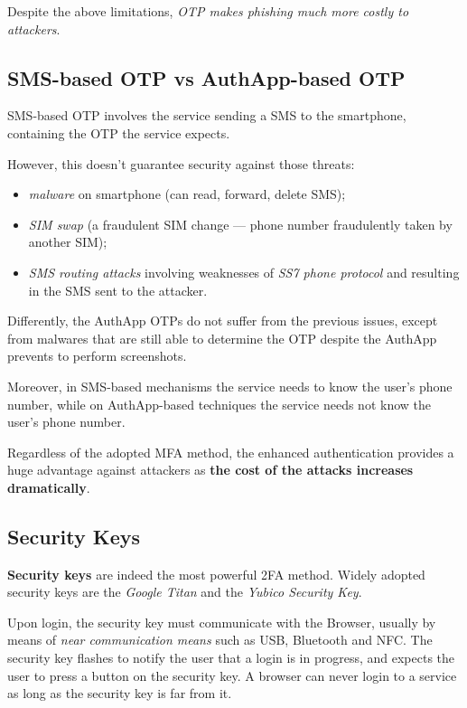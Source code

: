 \documentclass[10pt]{\classname}
\begin{document}
Despite the above limitations, \emph{OTP makes phishing much more costly to
attackers}.

\subsection{SMS\--based OTP vs AuthApp\--based OTP}

SMS\--based OTP involves the service sending a SMS to the smartphone,
containing the OTP the service expects.

However, this doesn't guarantee security against those threats:
\begin{itemize}
    \item \emph{malware} on smartphone (can read, forward, delete SMS);
    \item \emph{SIM swap} (a fraudulent SIM change --- phone number fraudulently
        taken by another SIM);
    \item \emph{SMS routing attacks} involving weaknesses of \emph{SS7 phone
        protocol} and resulting in the SMS sent to the attacker.
\end{itemize}

Differently, the AuthApp OTPs do not suffer from the previous issues, except
from malwares that are still able to determine the OTP despite the AuthApp
prevents to perform screenshots.

Moreover, in SMS\--based mechanisms the service needs to know the user's phone
number, while on AuthApp\--based techniques the service needs not know the
user's phone number.

Regardless of the adopted MFA method, the enhanced authentication provides a
huge advantage against attackers as \textbf{the cost of the attacks increases
dramatically}.

\subsection{Security Keys}

\textbf{Security keys} are indeed the most powerful 2FA method. Widely adopted
security keys are the \emph{Google Titan} and the \emph{Yubico Security Key}.

Upon login, the security key must communicate with the Browser, usually by
means of \emph{near communication means} such as USB, Bluetooth and NFC. The
security key flashes to notify the user that a login is in progress, and
expects the user to press a button on the security key. A browser can never
login to a service as long as the security key is far from it.
\end{document}
